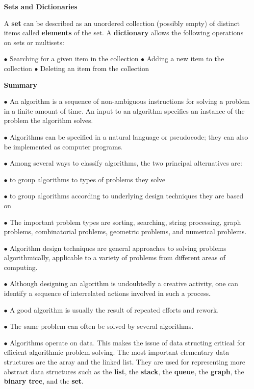 \vskip 1cm
{\bf Sets and Dictionaries}

\vskip 1mm
A {\bf set} can be described as an unordered collection (possibly empty) of distinct items called {\bf elements} of the set.
\vskip 1mm
A {\bf dictionary} allows the following operations on sets or multisets:

\vskip 1mm
\quad$\bullet$ Searching for a given item in the collection
\vskip 1mm
\quad$\bullet$ Adding a new item to the collection
\vskip 1mm
\quad$\bullet$ Deleting an item from the collection

\filbreak
\vskip 1cm
{\bf Summary}

\vskip 3mm
$\bullet$ An algorithm is a sequence of non-ambiguous instructions for solving a problem in a finite amount of time. An input to an algorithm specifies an instance of the problem the algorithm solves.

\vskip 3mm
$\bullet$ Algorithms can be specified in a natural language or pseudocode; they can also be implemented as computer programs.

\vskip 3mm
$\bullet$ Among several ways to classify algorithms, the two principal alternatives are:

\vskip 1mm
\qquad\qquad$\bullet$ to group algorithms to types of problems they solve

\vskip 1mm
\qquad\qquad$\bullet$ to group algorithms according to underlying design techniques they are based on

\vskip 3mm
$\bullet$ The important problem types are sorting, searching, string processing, graph problems, combinatorial problems, geometric problems, and numerical problems.

\vskip 3mm
$\bullet$ Algorithm design techniques are general approaches to solving problems algorithmically, applicable to a variety of problems from different areas of computing.

\vskip 3mm
$\bullet$ Although designing an algorithm is undoubtedly a creative activity, one can identify a sequence of interrelated actions involved in such a process.

\vskip 3mm
$\bullet$ A good algorithm is usually the result of repeated efforts and rework.

\vskip 3mm
$\bullet$ The same problem can often be solved by several algorithms.

\vskip 3mm
$\bullet$ Algorithms operate on data. This makes the issue of data structing critical for efficient algorithmic problem solving. The most important elementary data structures are the array and the linked list. They are used for representing more abstract data structures such as the {\bf list}, the {\bf stack}, the {\bf queue}, the {\bf graph}, the {\bf binary tree}, and the {\bf set}.

